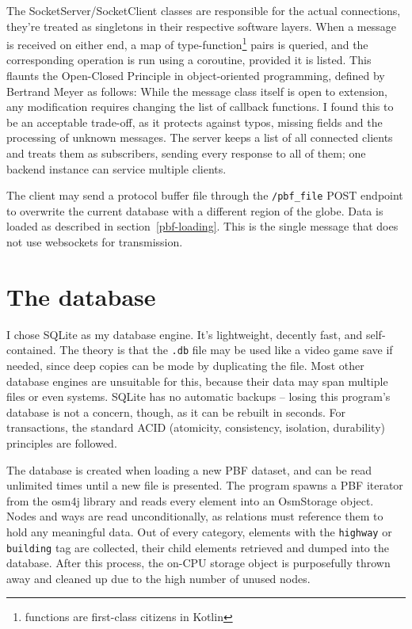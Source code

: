 The SocketServer/SocketClient classes are responsible for the actual connections, they're treated as singletons in their respective software layers. When a message is received on either end, a map of type-function\footnote{functions are first-class citizens in Kotlin} pairs is queried, and the corresponding operation is run using a coroutine, provided it is listed. This flaunts the Open-Closed Principle in object-oriented programming, defined by Bertrand Meyer\cite{OOSC-OCP} as follows:  While the message class itself is open to extension, any modification requires changing the list of callback functions. I found this to be an acceptable trade-off, as it protects against typos, missing fields and the processing of unknown messages.
The server keeps a list of all connected clients and treats them as subscribers, sending every response to all of them; one backend instance can service multiple clients.

\label{file-upload}
The client may send a protocol buffer file through the \verb|/pbf_file| POST endpoint to overwrite the current database with a different region of the globe. Data is loaded as described in section~\ref{pbf-loading}. This is the single message that does not use websockets for transmission.

\section{The database}

I chose SQLite as my database engine. It's lightweight, decently fast, and self-contained. The theory is that the \verb|.db| file may be used like a video game save if needed, since deep copies can be mode by duplicating the file. Most other database engines are unsuitable for this, because their data may span multiple files or even systems. SQLite has no automatic backups -- losing this program's database is not a concern, though, as it can be rebuilt in seconds. For transactions, the standard ACID (atomicity, consistency, isolation, durability) principles are followed.

\label{pbf-loading}
The database is created when loading a new PBF dataset, and can be read unlimited times until a new file is presented. The program spawns a PBF iterator from the osm4j library and reads every element into an OsmStorage object. Nodes and ways are read unconditionally, as relations must reference them to hold any meaningful data. Out of every category, elements with the \verb|highway| or \verb|building| tag are collected, their child elements retrieved and dumped into the database. After this process, the on-CPU storage object is purposefully thrown away and cleaned up due to the high number of unused nodes.

